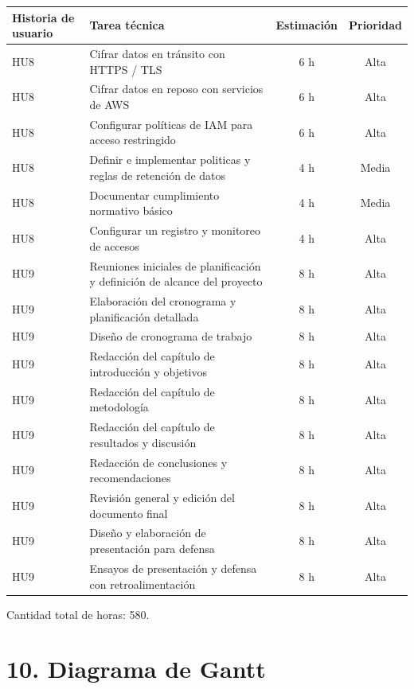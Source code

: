 \documentclass[
11pt, %
]{charter}
\begin{document}
\begin{table}[htpb]
\centering
\begin{tabularx}{\linewidth}{@{}|X|X|c|c|@{}}
\hline
\rowcolor[HTML]{C0C0C0}
Historia de usuario & Tarea técnica & Estimación & Prioridad \\ \hline
HU8 & Cifrar datos en tránsito con HTTPS / TLS	 					 & 6 h & Alta \\ \hline
HU8 & Cifrar datos en reposo con servicios de AWS 	 					 & 6 h & Alta \\ \hline
HU8 & Configurar políticas de IAM para acceso restringido 	 					 & 6 h & Alta \\ \hline
HU8 & Definir e implementar politicas y reglas de retención de datos  & 4 h & Media \\ \hline
HU8 & Documentar cumplimiento normativo básico  & 4 h & Media \\ \hline
HU8 & Configurar un registro y monitoreo de accesos  	 					 & 4 h & Alta \\ \hline
HU9 & Reuniones iniciales de planificación y definición de alcance del proyecto  	 					 & 8 h & Alta \\ \hline
HU9 & Elaboración del cronograma y planificación detallada	  	 					 & 8 h & Alta \\ \hline
HU9 & Diseño de cronograma de trabajo  	 					 & 8 h & Alta \\ \hline
HU9 & Redacción del capítulo de introducción y objetivos	  	 					 & 8 h & Alta \\ \hline
HU9 & Redacción del capítulo de metodología	  	 					 & 8 h & Alta \\ \hline
HU9 & Redacción del capítulo de resultados y discusión	  	 					 & 8 h & Alta \\ \hline
HU9 & Redacción de conclusiones y recomendaciones	  	 					 & 8 h & Alta \\ \hline
HU9 & Revisión general y edición del documento final		  	 					 & 8 h & Alta \\ \hline
HU9 & Diseño y elaboración de presentación para defensa		  	 					 & 8 h & Alta \\ \hline
HU9 & Ensayos de presentación y defensa con retroalimentación		  	 					 & 8 h & Alta \\ \hline
\end{tabularx}
\end{table}

Cantidad total de horas: 580.
\section{10. Diagrama de Gantt}
\label{sec:gantt}
\end{document}
